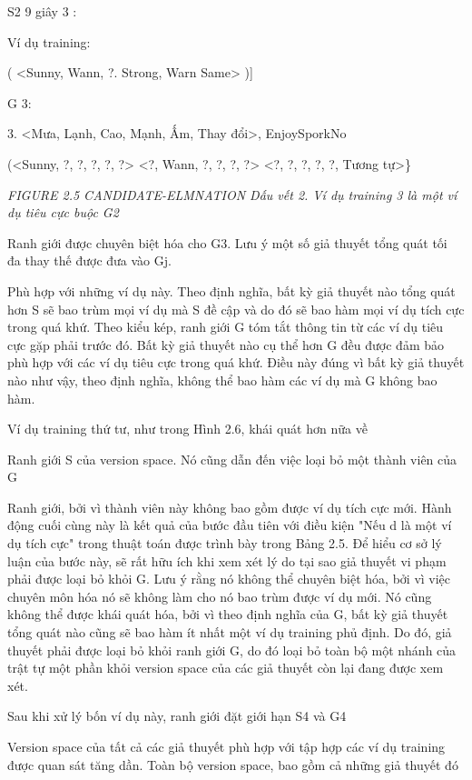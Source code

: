 S2 9 giây 3 :

Ví dụ training:

( <Sunny, Wann, ?. Strong, Warn Same> )]

G 3:

3. <Mưa, Lạnh, Cao, Mạnh, Ấm, Thay đổi>, EnjoySporkNo

(<Sunny, ?, ?, ?, ?, ?> <?, Wann, ?, ?, ?, ?> <?, ?, ?, ?, ?, Tương tự>\}

\noindent\textit{FIGURE 2.5 CANDIDATE-ELMNATION Dấu vết 2. Ví dụ training 3 là một ví dụ tiêu cực buộc G2}

Ranh giới được chuyên biệt hóa cho G3. Lưu ý một số giả thuyết tổng quát tối đa thay thế được đưa vào Gj.

Phù hợp với những ví dụ này. Theo định nghĩa, bất kỳ giả thuyết nào tổng quát hơn S sẽ bao trùm mọi ví dụ mà S đề cập và do đó sẽ bao hàm mọi ví dụ tích cực trong quá khứ. Theo kiểu kép, ranh giới G tóm tắt thông tin từ các ví dụ tiêu cực gặp phải trước đó. Bất kỳ giả thuyết nào cụ thể hơn G đều được đảm bảo phù hợp với các ví dụ tiêu cực trong quá khứ. Điều này đúng vì bất kỳ giả thuyết nào như vậy, theo định nghĩa, không thể bao hàm các ví dụ mà G không bao hàm.

Ví dụ training thứ tư, như trong Hình 2.6, khái quát hơn nữa về

Ranh giới S của version space. Nó cũng dẫn đến việc loại bỏ một thành viên của G

Ranh giới, bởi vì thành viên này không bao gồm được ví dụ tích cực mới. Hành động cuối cùng này là kết quả của bước đầu tiên với điều kiện "Nếu d là một ví dụ tích cực" trong thuật toán được trình bày trong Bảng 2.5. Để hiểu cơ sở lý luận của bước này, sẽ rất hữu ích khi xem xét lý do tại sao giả thuyết vi phạm phải được loại bỏ khỏi G. Lưu ý rằng nó không thể chuyên biệt hóa, bởi vì việc chuyên môn hóa nó sẽ không làm cho nó bao trùm được ví dụ mới. Nó cũng không thể được khái quát hóa, bởi vì theo định nghĩa của G, bất kỳ giả thuyết tổng quát nào cũng sẽ bao hàm ít nhất một ví dụ training phủ định. Do đó, giả thuyết phải được loại bỏ khỏi ranh giới G, do đó loại bỏ toàn bộ một nhánh của trật tự một phần khỏi version space của các giả thuyết còn lại đang được xem xét.

Sau khi xử lý bốn ví dụ này, ranh giới đặt giới hạn S4 và G4

Version space của tất cả các giả thuyết phù hợp với tập hợp các ví dụ training được quan sát tăng dần. Toàn bộ version space, bao gồm cả những giả thuyết đó


